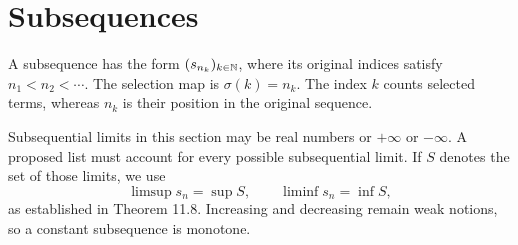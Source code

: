 \section{Subsequences}
\label{sec:subsequences}
A subsequence has the form $(s_{n_k})_{k\in\mathbb{N}}$, where its original
indices satisfy $n_1<n_2<\cdots$. The selection map is
$\sigma(k)=n_k$. The index $k$ counts selected terms, whereas $n_k$
is their position in the original sequence.

Subsequential limits in this section may be real numbers or
$+\infty$ or $-\infty$. A proposed list must account for every
possible subsequential limit. If $S$ denotes the set of those limits,
we use
\[
 \limsup s_n=\sup S,\qquad \liminf s_n=\inf S,
\]
as established in Theorem 11.8. Increasing and decreasing remain
weak notions, so a constant subsequence is monotone.



